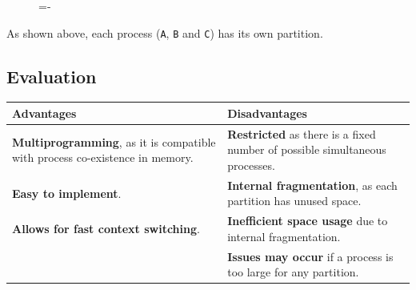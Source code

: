 \documentclass[a4paper]{systems-software}
\begin{document}
\begin{figure}[H]
  \lineskip=-\fboxrule
\end{figure}

As shown above, each process (\texttt{A}, \texttt{B} and \texttt{C}) has its own partition.


\subsection*{Evaluation}

\begin{longtabu} to \textwidth {| X[1,l] | X[1,l] |}
    \hline
    \textbf{Advantages} & \textbf{Disadvantages}
	\\ \hline
	\textbf{Multiprogramming}, as it is compatible with process co-existence in memory. &
	\textbf{Restricted} as there is a fixed number of possible simultaneous processes.
	\\ \hline
	\textbf{Easy to implement}. &
	\textbf{Internal fragmentation}, as each partition has unused space.
	\\ \hline
	\textbf{Allows for fast context switching}. & \textbf{Inefficient space usage} due to internal fragmentation.
	\\ \hline
	& \textbf{Issues may occur} if a process is too large for any partition.
	\\ \hline
\end{longtabu}
\end{document}
